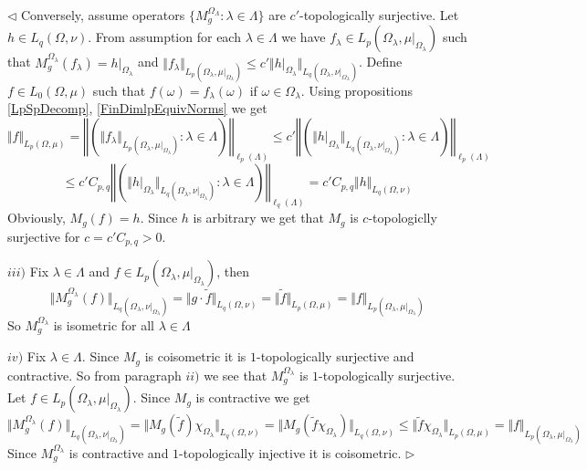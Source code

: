 \documentclass[12pt]{article}
\newenvironment{proof}{\par $\triangleleft$}{$\triangleright$}
\begin{document}
\begin{proof}
Conversely, assume operators $\{M_g^{\Omega_\Lambda}:\lambda\in\Lambda\}$ are $c'$-topologically surjective. Let $h\in L_q(\Omega,\nu)$. From assumption for each $\lambda\in\Lambda$ we have $f_\lambda\in L_p(\Omega_\lambda,\mu|_{\Omega_\lambda})$ such that $M_g^{\Omega_\lambda}(f_\lambda)=h|_{\Omega_\lambda}$ and $\Vert f_\lambda\Vert_{L_p(\Omega_\lambda,\mu|_{\Omega_\lambda})}\leq c'\Vert h|_{\Omega_\lambda}\Vert_{L_q(\Omega_\lambda,\nu|_{\Omega_\lambda})}$. Define $f\in L_0(\Omega,\mu)$ such that $f(\omega)=f_\lambda(\omega)$ if $\omega\in\Omega_\lambda$.  Using propositions \ref{LpSpDecomp}, \ref{FinDimlpEquivNorms} we get
$$
\Vert f\Vert_{L_p(\Omega,\mu)}
=\left\Vert\left(\Vert f_\lambda\Vert_{L_p(\Omega_\lambda,\mu|_{\Omega_\lambda})}:\lambda\in\Lambda\right)\right\Vert_{\ell_p(\Lambda)}
\leq c'\left\Vert\left(\Vert h|_{\Omega_\lambda}\Vert_{L_q(\Omega_\lambda,\nu|_{\Omega_\lambda})}:\lambda\in\Lambda\right)\right\Vert_{\ell_p(\Lambda)}
$$
$$
\leq c'C_{p,q}\left\Vert\left(\Vert h|_{\Omega_\lambda}\Vert_{L_q(\Omega_\lambda,\nu|_{\Omega_\lambda})}:\lambda\in\Lambda\right)\right\Vert_{\ell_q(\Lambda)}
=c'C_{p,q}\Vert h\Vert_{L_q(\Omega,\nu)}
$$
Obviously, $M_g(f)=h$. Since $h$ is arbitrary we get that $M_g$ is $c$-topologiclly surjective for $c=c'C_{p,q}>0$.

$iii)$ Fix $\lambda\in\Lambda$ and $f\in L_p(\Omega_\lambda,\mu|_{\Omega_\lambda})$, then
$$
\Vert M_g^{\Omega_\lambda}(f)\Vert_{L_q(\Omega_\lambda,\nu|_{\Omega_\lambda})}
=\Vert g\cdot \widetilde{f}\Vert_{L_q(\Omega,\nu)}
=\Vert\widetilde{f}\Vert_{L_p(\Omega,\mu)}
=\Vert f\Vert_{L_p(\Omega_\lambda,\mu|_{\Omega_\lambda})}
$$
So $M_g^{\Omega_\lambda}$ is isometric for all $\lambda\in\Lambda$

$iv)$ Fix $\lambda\in\Lambda$. Since $M_g$ is coisometric it is $1$-topologically surjective and contractive. So from paragraph $ii)$ we see that $M_g^{\Omega_\lambda}$ is $1$-topologically surjective. Let $f\in L_p(\Omega_\lambda,\mu|_{\Omega_\lambda})$. Since $M_g$ is contractive we get
$$
\Vert M_g^{\Omega_\lambda}(f)\Vert_{L_q(\Omega_\lambda,\nu|_{\Omega_\lambda})}
=\Vert M_g(\widetilde{f})\chi_{\Omega_\lambda}\Vert_{L_q(\Omega,\nu)}
=\Vert M_g(\widetilde{f}\chi_{\Omega_\lambda})\Vert_{L_q(\Omega,\nu)}
\leq \Vert\widetilde{f}\chi_{\Omega_\lambda}\Vert_{L_p(\Omega,\mu)}
=\Vert f\Vert_{L_p(\Omega_{\lambda},\mu|_{\Omega_\lambda})}
$$
Since $M_g^{\Omega_\lambda}$ is contractive and $1$-topologically injective it is coisometric.
\end{proof}
\end{document}
